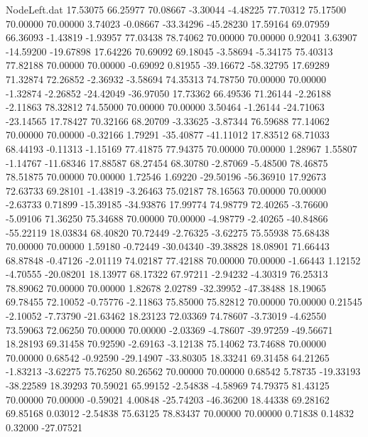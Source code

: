 \begin{filecontents}{NodeLeft.dat}
  17.53075   66.25977   70.08667    -3.30044   -4.48225   77.70312   75.17500   70.00000   70.00000    3.74023   -0.08667  -33.34296  -45.28230
  17.59164   69.07959   66.36093    -1.43819   -1.93957   77.03438   78.74062   70.00000   70.00000    0.92041    3.63907  -14.59200  -19.67898
  17.64226   70.69092   69.18045    -3.58694   -5.34175   75.40313   77.82188   70.00000   70.00000   -0.69092    0.81955  -39.16672  -58.32795
  17.69289   71.32874   72.26852    -2.36932   -3.58694   74.35313   74.78750   70.00000   70.00000   -1.32874   -2.26852  -24.42049  -36.97050
  17.73362   66.49536   71.26144    -2.26188   -2.11863   78.32812   74.55000   70.00000   70.00000    3.50464   -1.26144  -24.71063  -23.14565
  17.78427   70.32166   68.20709    -3.33625   -3.87344   76.59688   77.14062   70.00000   70.00000   -0.32166    1.79291  -35.40877  -41.11012
  17.83512   68.71033   68.44193    -0.11313   -1.15169   77.41875   77.94375   70.00000   70.00000    1.28967    1.55807   -1.14767  -11.68346
  17.88587   68.27454   68.30780    -2.87069   -5.48500   78.46875   78.51875   70.00000   70.00000    1.72546    1.69220  -29.50196  -56.36910
  17.92673   72.63733   69.28101    -1.43819   -3.26463   75.02187   78.16563   70.00000   70.00000   -2.63733    0.71899  -15.39185  -34.93876
  17.99774   74.98779   72.40265    -3.76600   -5.09106   71.36250   75.34688   70.00000   70.00000   -4.98779   -2.40265  -40.84866  -55.22119
  18.03834   68.40820   70.72449    -2.76325   -3.62275   75.55938   75.68438   70.00000   70.00000    1.59180   -0.72449  -30.04340  -39.38828
  18.08901   71.66443   68.87848    -0.47126   -2.01119   74.02187   77.42188   70.00000   70.00000   -1.66443    1.12152   -4.70555  -20.08201
  18.13977   68.17322   67.97211    -2.94232   -4.30319   76.25313   78.89062   70.00000   70.00000    1.82678    2.02789  -32.39952  -47.38488
  18.19065   69.78455   72.10052    -0.75776   -2.11863   75.85000   75.82812   70.00000   70.00000    0.21545   -2.10052   -7.73790  -21.63462
  18.23123   72.03369   74.78607    -3.73019   -4.62550   73.59063   72.06250   70.00000   70.00000   -2.03369   -4.78607  -39.97259  -49.56671
  18.28193   69.31458   70.92590    -2.69163   -3.12138   75.14062   73.74688   70.00000   70.00000    0.68542   -0.92590  -29.14907  -33.80305
  18.33241   69.31458   64.21265    -1.83213   -3.62275   75.76250   80.26562   70.00000   70.00000    0.68542    5.78735  -19.33193  -38.22589
  18.39293   70.59021   65.99152    -2.54838   -4.58969   74.79375   81.43125   70.00000   70.00000   -0.59021    4.00848  -25.74203  -46.36200
  18.44338   69.28162   69.85168     0.03012   -2.54838   75.63125   78.83437   70.00000   70.00000    0.71838    0.14832    0.32000  -27.07521

\end{filecontents}

